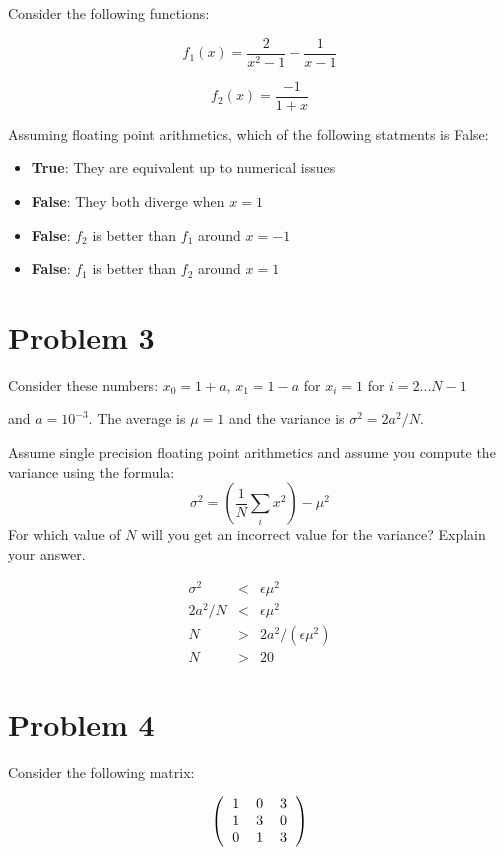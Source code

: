 \documentclass[12pt]{article}
\begin{document}
\noindent Consider the following functions:

\[
f_1(x) = \frac2{x^2-1} - \frac1{x-1}
\]

\[
f_2(x) = \frac{-1}{1+x}
\]

\noindent Assuming floating point arithmetics, which of the following statments is False:

\begin{itemize}
\item {\bf True}: They are equivalent up to numerical issues
\item {\bf False}: They both diverge when $x=1$
\item {\bf False}: $f_2$ is better than $f_1$ around $x=-1$
\item {\bf False}: $f_1$ is better than $f_2$ around $x=1$
\end{itemize}

\newpage\section{Problem 3}

\noindent Consider these numbers:
$x_0 = 1+a$, $x_1 = 1-a$ for $x_i=1$ for $i = 2...N-1$

\noindent and $a=10^{-3}$. The average is $\mu = 1$ and the variance is $\sigma^2 = 2a^2/N$.

\noindent Assume single precision floating point arithmetics and assume you compute the variance using the formula:
\[
\sigma^2 = (\frac{1}{N} \sum_i x^2) - \mu^2
\]
\noindent For which value of $N$ will you get an incorrect value for the variance? Explain your answer.

\begin{eqnarray}
\sigma^2 &<& \epsilon \mu^2  \\
2a^2/N &<& \epsilon \mu^2 \\
N &>& 2a^2/(\epsilon \mu^2) \\
N &>& 20
\end{eqnarray}

\newpage\section{Problem 4}

\noindent Consider the following matrix:

\[
\left(
\begin{tabular}{ccc}
1 & 0 & 3 \\
1 & 3 & 0 \\ 
0 & 1 & 3 
\end{tabular}
\right)
\]
\end{document}
